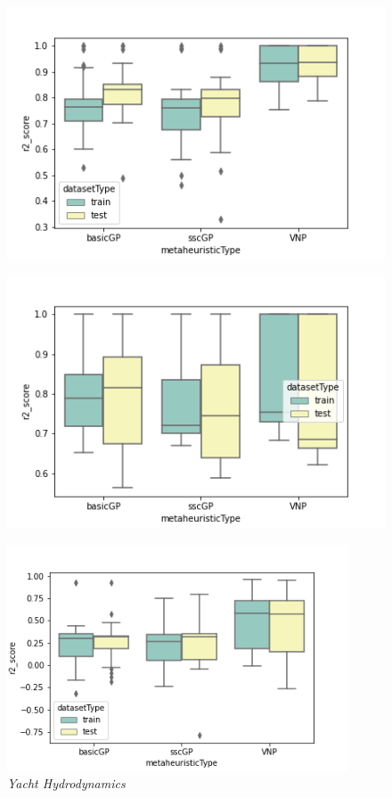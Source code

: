 \documentclass[main.tex]{subfiles}
\begin{document}
\begin{figure}
\centering
\begin{minipage}{.5\textwidth}
  \centering
  \includegraphics[width=1.1\linewidth]{../images/f04.png}
  \label{fig:f04}
\end{minipage}%
\begin{minipage}{.5\textwidth}
  \centering
  \includegraphics[width=1.1\linewidth]{../images/f05.png}
  \label{fig:f05}
\end{minipage}
\end{figure}


\begin{figure}[!ht]
\begin{center}
\includegraphics[width=0.9\textwidth]{../images/yacht_hydrodynamics.png}
\end{center}
\caption{\textit{Yacht Hydrodynamics}}
\label{fig:yacht}
\end{figure}
\end{document}
